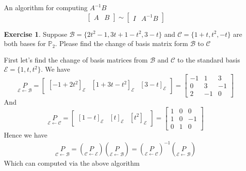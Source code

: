 \documentclass{beamer}
\theoremstyle{definition}
\newtheorem{exercise}[theorem]{Exercise}
\theoremstyle{remark}
\begin{document}
\begin{frame}[t]
An algorithm for computing $A^{-1}B$\pause
\[
\left[\begin{array}{c|c}
A&B
\end{array}\right]\sim\left[\begin{array}{c|c}
I&A^{-1}B
\end{array}\right]
\]
\pause
\begin{exercise}
Suppose $\mathcal B=\{2t^2-1,3t+1-t^2,3-t\}$ and $\mathcal C=\{1+t,t^2,-t\}$ are both bases for $\mathbb P_2$. Please find the change of basis matrix form $\mathcal B$ to $\mathcal C$
\end{exercise}
\end{frame}

\begin{frame}[t]
\begin{solution}
First let's find the change of basis matrices from $\mathcal B$ and $\mathcal C$ to the standard basis $\mathcal E=\{1,t,t^2\}$\pause. We have
\[
\underset{\mathcal E\leftarrow\mathcal B}{P}=\begin{bmatrix}
[-1+2t^2]_{\mathcal E}&[1+3t-t^2]_{\mathcal E}&[3-t]_{\mathcal E}
\end{bmatrix}=\begin{bmatrix}
-1&1&3\\
0&3&-1\\
2&-1&0
\end{bmatrix}
\]\pause
And
\[
\underset{\mathcal E\leftarrow\mathcal C}{P}=\begin{bmatrix}
[1-t]_{\mathcal E}&[t]_{\mathcal E}&[t^2]_{\mathcal E}
\end{bmatrix}=\begin{bmatrix}
1&0&0\\
1&0&-1\\
0&1&0
\end{bmatrix}
\]\pause
Hence we have
\begin{align*}
\underset{\mathcal C\leftarrow\mathcal B}{P}=\left(\underset{\mathcal C\leftarrow\mathcal E}{P}\right)\left(\underset{\mathcal E\leftarrow\mathcal B}{P}\right)=\left(\underset{\mathcal E\leftarrow\mathcal C}{P}\right)^{-1}\left(\underset{\mathcal E\leftarrow\mathcal B}{P}\right)
\end{align*}
Which can computed via the above algorithm
\end{solution}
\end{frame}
\end{document}
